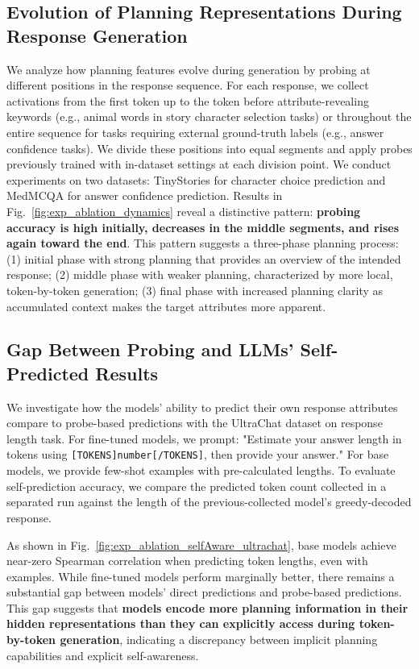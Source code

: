 \subsection{Evolution of Planning Representations During Response Generation}
We analyze how planning features evolve during generation by probing at different positions in the response sequence. For each response, we collect activations from the first token up to the token before attribute-revealing keywords (e.g., animal words in story character selection tasks) or throughout the entire sequence for tasks requiring external ground-truth labels (e.g., answer confidence tasks). We divide these positions into equal segments and apply  probes previously trained with in-dataset settings at each division point.
We conduct experiments on two datasets: TinyStories for character choice prediction and MedMCQA for answer confidence prediction. Results in Fig.~\ref{fig:exp_ablation_dynamics} reveal a distinctive pattern: \textbf{probing accuracy is high initially, decreases in the middle segments, and rises again toward the end}. This pattern suggests a three-phase planning process:
(1) initial phase with strong planning that provides an overview of the intended response;
(2) middle phase with weaker planning, characterized by more local, token-by-token generation;
(3) final phase with increased planning clarity as accumulated context makes the target attributes more apparent.



\subsection{Gap Between Probing and LLMs' Self-Predicted Results}

We investigate how the models' ability to predict their own response attributes compare to probe-based predictions with the UltraChat dataset on response length task. For fine-tuned models, we prompt: "Estimate your answer length in tokens using \texttt{[TOKENS]number[/TOKENS]}, then provide your answer." For base models, we provide few-shot examples with pre-calculated lengths. To evaluate self-prediction accuracy, we compare the predicted token count collected in a separated run against the length of the previous-collected model's greedy-decoded response.

As shown in Fig.~\ref{fig:exp_ablation_selfAware_ultrachat}, base models achieve near-zero Spearman correlation when predicting token lengths, even with examples. While fine-tuned models perform marginally better, there remains a substantial gap between models' direct predictions and probe-based predictions.
This gap suggests that \textbf{models encode more planning information in their hidden representations than they can explicitly access during token-by-token generation}, indicating a discrepancy between implicit planning capabilities and explicit self-awareness.


